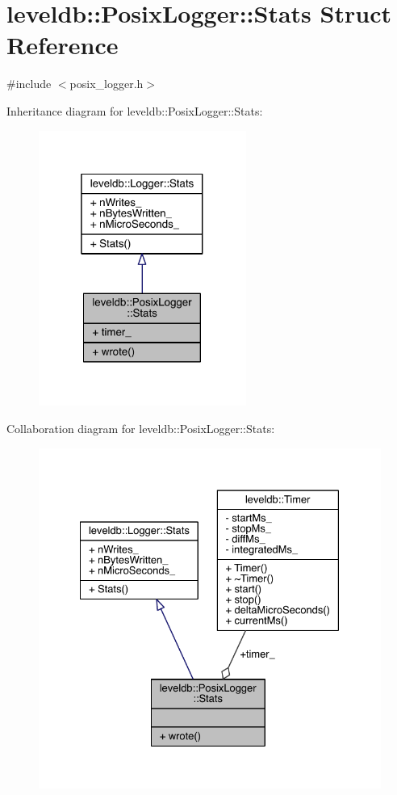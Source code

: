 \hypertarget{structleveldb_1_1_posix_logger_1_1_stats}{}\section{leveldb\+:\+:Posix\+Logger\+:\+:Stats Struct Reference}
\label{structleveldb_1_1_posix_logger_1_1_stats}


{\ttfamily \#include $<$posix\+\_\+logger.\+h$>$}



Inheritance diagram for leveldb\+:\+:Posix\+Logger\+:\+:Stats\+:
\nopagebreak
\begin{figure}[H]
\begin{center}
\leavevmode
\includegraphics[width=193pt]{structleveldb_1_1_posix_logger_1_1_stats__inherit__graph}
\end{center}
\end{figure}


Collaboration diagram for leveldb\+:\+:Posix\+Logger\+:\+:Stats\+:
\nopagebreak
\begin{figure}[H]
\begin{center}
\leavevmode
\includegraphics[width=328pt]{structleveldb_1_1_posix_logger_1_1_stats__coll__graph}
\end{center}
\end{figure}
